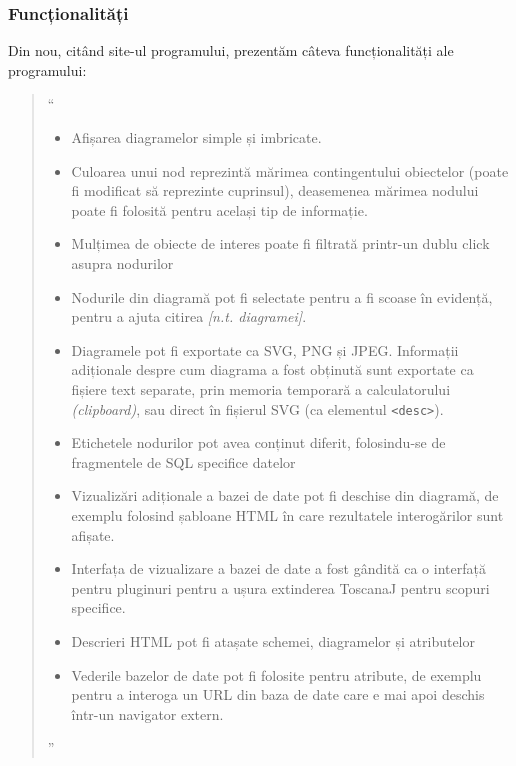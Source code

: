 \documentclass[12pt, a4paper, twoside, romanian]{teza-upb}
\begin{document}
      \subsubsection{Funcționalități}
      \label{subsubsec:toscanaj-functionalitati}
      
        Din nou, citând site-ul programului\cite{Toscanaj:toscanaj}, prezentăm câteva funcționalități ale programului:

        \begin{quote}
          ``
          \begin{itemize}
            \item Afișarea diagramelor simple și imbricate.
            \item Culoarea unui nod reprezintă mărimea contingentului obiectelor (poate fi modificat să reprezinte cuprinsul), deasemenea mărimea nodului poate fi folosită pentru același tip de informație.
            \item Mulțimea de obiecte de interes poate fi filtrată printr-un dublu click asupra nodurilor
            \item Nodurile din diagramă pot fi selectate pentru a fi scoase în evidență, pentru a ajuta citirea \textit{[n.t. diagramei]}.
            \item Diagramele pot fi exportate ca SVG, PNG și JPEG. Informații adiționale despre cum diagrama a fost obținută sunt exportate ca fișiere text separate, prin memoria temporară a calculatorului \textit{(clipboard)}, sau direct în fișierul SVG (ca elementul \verb=<desc>=).
            \item Etichetele nodurilor pot avea conținut diferit, folosindu-se de fragmentele de SQL specifice datelor
            \item Vizualizări adiționale a bazei de date pot fi deschise din diagramă, de exemplu folosind șabloane HTML în care rezultatele interogărilor sunt afișate.
            \item Interfața de vizualizare a bazei de date a fost gândită ca o interfață pentru pluginuri pentru a ușura extinderea ToscanaJ pentru scopuri specifice.
            \item Descrieri HTML pot fi atașate schemei, diagramelor și atributelor
            \item Vederile bazelor de date pot fi folosite pentru atribute, de exemplu pentru a interoga un URL din baza de date care e mai apoi deschis într-un navigator extern.
          \end{itemize}
          ''
        \end{quote}
\end{document}

